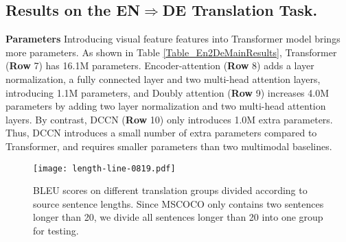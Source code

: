 \documentclass[sigconf]{acmart}
\begin{document}
\subsection{Results on the EN$\Rightarrow$DE Translation Task.}

\textbf{Parameters} Introducing visual feature features into Transformer model brings more parameters. As shown in Table \ref{Table_En2DeMainResults}, Transformer (\textbf{Row} 7) has 16.1M parameters. Encoder-attention (\textbf{Row} 8) adds a layer normalization, a fully connected layer and two multi-head attention layers, introducing 1.1M parameters, and Doubly attention (\textbf{Row} 9) increases 4.0M parameters by adding two layer normalization and two multi-head attention layers. By contrast, DCCN (\textbf{Row} 10) only introduces 1.0M extra parameters. Thus, DCCN introduces a small number of extra parameters compared to Transformer, and requires smaller parameters than two multimodal baselines. 

\iffalse
\textbf{Speed} When running on a single GPU device GeForce GTX 1080Ti, the speed of Transformer is about 12,000 target tokens per second. Apparently, introducing visual features to the model slows down the training speed. Specifically, Encoder-attention has a speed of 2,500 tokens per second, and Doubly-attention can generate 2,200 tokens per second. Compared with these two multimodal baselines, the speed of DCCN declines further, achieving about 1,900 tokens per second.
\fi


\begin{figure*}[!t]
\centering
\texttt{[image: length-line-0819.pdf]}
\caption{
\label{Fig_En2De_LengthEffect}
BLEU scores on different translation groups divided according to source sentence lengths. Since MSCOCO only contains two sentences longer than 20, we divide all sentences longer than 20 into one group for testing. 
}
\end{figure*}
\end{document}
